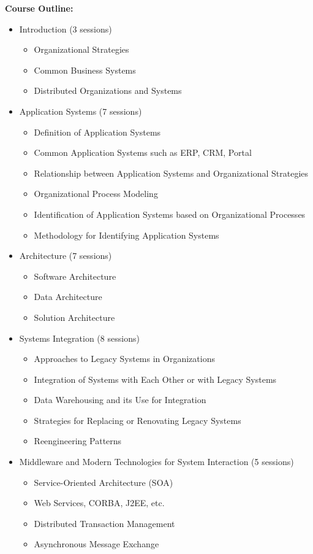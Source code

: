 \documentclass[12pt]{article}
\begin{document}
\textbf{Course Outline:}
\begin{itemize}
    \item Introduction (3 sessions)
    \begin{itemize}
        \item Organizational Strategies
        \item Common Business Systems
        \item Distributed Organizations and Systems
    \end{itemize}
    \item Application Systems (7 sessions)
    \begin{itemize}
        \item Definition of Application Systems
        \item Common Application Systems such as ERP, CRM, Portal
        \item Relationship between Application Systems and Organizational Strategies
        \item Organizational Process Modeling
        \item Identification of Application Systems based on Organizational Processes
        \item Methodology for Identifying Application Systems
    \end{itemize}
    \item Architecture (7 sessions)
    \begin{itemize}
        \item Software Architecture
        \item Data Architecture
        \item Solution Architecture
    \end{itemize}
    \item Systems Integration (8 sessions)
    \begin{itemize}
        \item Approaches to Legacy Systems in Organizations
        \item Integration of Systems with Each Other or with Legacy Systems
        \item Data Warehousing and its Use for Integration
        \item Strategies for Replacing or Renovating Legacy Systems
        \item Reengineering Patterns
    \end{itemize}
    \item Middleware and Modern Technologies for System Interaction (5 sessions)
    \begin{itemize}
        \item Service-Oriented Architecture (SOA)
        \item Web Services, CORBA, J2EE, etc.
        \item Distributed Transaction Management
        \item Asynchronous Message Exchange
    \end{itemize}
\end{itemize}
\end{document}
